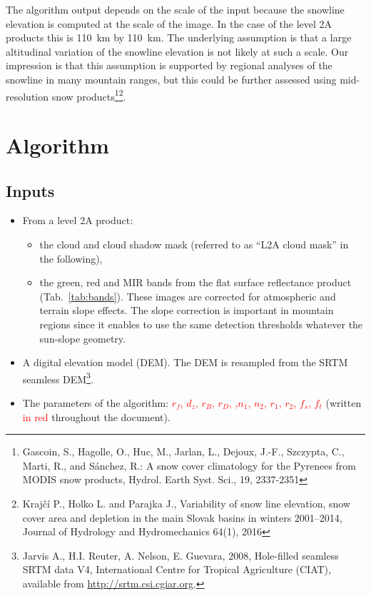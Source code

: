 \documentclass[a4paper]{article}
\begin{document}
The algorithm output depends on the scale of the input because the snowline elevation is computed at the scale of the image. In the case of the level 2A products this is 110~km by 110~km. The underlying assumption is that a large altitudinal variation of the snowline elevation is not likely at such a scale. Our impression is that this assumption is supported by regional analyses of the snowline in many mountain ranges, but this could be further assessed using mid-resolution snow products\footnote{Gascoin, S., Hagolle, O., Huc, M., Jarlan, L., Dejoux, J.-F., Szczypta, C., Marti, R., and Sánchez, R.: A snow cover climatology for the Pyrenees from MODIS snow products, Hydrol. Earth Syst. Sci., 19, 2337-2351}\footnote{Krajčí P., Holko L. and Parajka J., Variability of snow line elevation, snow cover area and depletion in the main Slovak basins in winters 2001–2014, Journal of Hydrology and Hydromechanics 64(1), 2016}.

\section{Algorithm}\label{par:algo}

\subsection{Inputs}\label{par:inputs}
\begin{itemize}
 \item From a level 2A product:
 \begin{itemize}
  \item the cloud and cloud shadow mask (referred to as ``L2A cloud mask'' in the following),
  \item the green, red and MIR bands from the flat surface reflectance product (Tab.~\ref{tab:bands}). These images are corrected for atmospheric and terrain slope effects. The slope correction is important in mountain regions since it enables to use the same detection thresholds whatever the sun-slope geometry. 
  \end{itemize}
  \item A digital elevation model (DEM). The DEM is resampled from the SRTM seamless DEM\footnote{Jarvis A., H.I. Reuter, A.  Nelson, E. Guevara, 2008, Hole-filled  seamless SRTM data V4, International  Centre for Tropical  Agriculture (CIAT), available  from \url{http://srtm.csi.cgiar.org}.}. 
  \item The parameters of the algorithm: \textcolor{red}{$r_f$, $d_z$, $r_B$, $r_D$, ,$n_1$, $n_2$, $r_1$, $r_2$, $f_s$, $f_t$} (written \textcolor{red}{in red} throughout the document).
  
\end{itemize}
\end{document}
